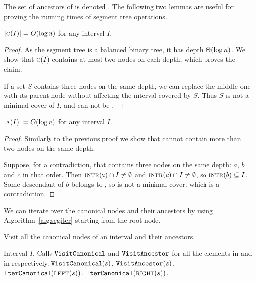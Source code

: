 \documentclass[english,gradu]{tktltiki2018}
\begin{document}
The set of ancestors of  is denoted .
The following two lemmas are useful for proving the running times of segment tree operations.

\begin{lem}\label{lem:canonlog}$\left |\textsc{c}(I)\right |=O(\log n)$ for any interval $I$.\end{lem}
\begin{proof}
As the segment tree is a balanced binary tree, it has depth $\Theta(\log n)$.
We show that $\textsc{c}(I)$ contains at most two nodes on each depth, which proves the claim.

If a set $S$ contains three nodes on the same depth, we can replace the middle one with its parent node without affecting the interval covered by $S$.
Thus $S$ is not a minimal cover of $I$, and can not be .
\end{proof}

\begin{lem}\label{lem:canonplog}$\left |\textsc{a}(I)\right |=O(\log n)$ for any interval $I$.\end{lem}
\begin{proof}
Similarly to the previous proof we show that  cannot contain more than two nodes on the same depth.

Suppose, for a contradiction, that  contains three nodes on the same depth: $a$, $b$ and $c$ in that order.
Then $\textsc{intr}(a)\cap I\neq\emptyset$ and $\textsc{intr}(c)\cap I\neq\emptyset$, so $\textsc{intr}(b)\subseteq I$.
Some descendant of $b$ belongs to , so  is not a minimal cover, which is a contradiction.
\end{proof}

We can iterate over the canonical nodes and their ancestors by using Algorithm~\ref{alg:segiter} starting from the root node.

\begin{algorithm}
\caption{Visit all the canonical nodes of an interval and their ancestors.}\label{alg:segiter}
\begin{algorithmic}
\Require Interval $I$.
\Ensure Calls $\texttt{VisitCanonical}$ and $\texttt{VisitAncestor}$ for all the elements in  and in  respectively.
		\State $\texttt{VisitCanonical}(s)$.
		\State $\texttt{VisitAncestor}(s)$.
		\State $\texttt{IterCanonical}(\textsc{left}(s))$.
		\State $\texttt{IterCanonical}(\textsc{right}(s))$.
	\EndIf
\EndProcedure
\end{algorithmic}
\end{algorithm}
\end{document}
